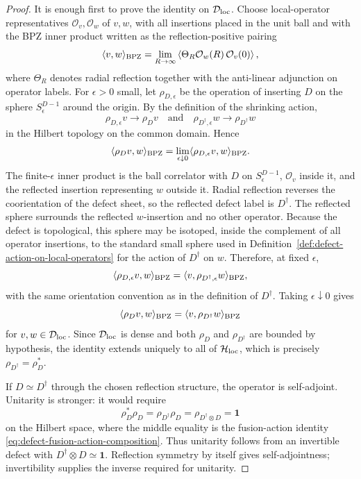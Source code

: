 \begin{proof}
It is enough first to prove the identity on
\(\mathcal D_{\rm loc}\).  Choose local-operator representatives
\(\mathcal O_v,\mathcal O_w\) of \(v,w\), with all insertions placed in the
unit ball and with the BPZ inner product written as the reflection-positive
pairing
\[
  \langle v,w\rangle_{\rm BPZ}
  =
  \lim_{R\to\infty}
  \left\langle
    \Theta_R\mathcal O_w(R)\,\mathcal O_v(0)
  \right\rangle ,
\]
where \(\Theta_R\) denotes radial reflection together with the anti-linear
adjunction on operator labels.  For \(\epsilon>0\) small, let
\(\rho_{D,\epsilon}\) be the operation of inserting \(D\) on the sphere
\(S_\epsilon^{D-1}\) around the origin.  By the definition of the shrinking
action,
\[
  \rho_{D,\epsilon}v\longrightarrow \rho_D v
  \quad\text{and}\quad
  \rho_{D^\dagger,\epsilon}w\longrightarrow \rho_{D^\dagger}w
\]
in the Hilbert topology on the common domain.  Hence
\[
  \langle \rho_Dv,w\rangle_{\rm BPZ}
  =
  \lim_{\epsilon\downarrow0}
  \langle \rho_{D,\epsilon}v,w\rangle_{\rm BPZ}.
\]
The finite-\(\epsilon\) inner product is the ball correlator with \(D\) on
\(S_\epsilon^{D-1}\), \(\mathcal O_v\) inside it, and the reflected insertion
representing \(w\) outside it.  Radial reflection reverses the coorientation
of the defect sheet, so the reflected defect label is \(D^\dagger\).  The
reflected sphere surrounds the reflected \(w\)-insertion and no other
operator.  Because the defect is topological, this sphere may be isotoped,
inside the complement of all operator insertions, to the standard small sphere
used in Definition~\ref{def:defect-action-on-local-operators} for the action
of \(D^\dagger\) on \(w\).  Therefore, at fixed \(\epsilon\),
\[
  \langle \rho_{D,\epsilon}v,w\rangle_{\rm BPZ}
  =
  \langle v,\rho_{D^\dagger,\epsilon}w\rangle_{\rm BPZ},
\]
with the same orientation convention as in the definition of \(D^\dagger\).
Taking \(\epsilon\downarrow0\) gives
\[
  \langle \rho_Dv,w\rangle_{\rm BPZ}
  =
  \langle v,\rho_{D^\dagger}w\rangle_{\rm BPZ}
\]
for \(v,w\in\mathcal D_{\rm loc}\).  Since
\(\mathcal D_{\rm loc}\) is dense and both \(\rho_D\) and
\(\rho_{D^\dagger}\) are bounded by hypothesis, the identity extends
uniquely to all of \(\mathcal H_{\rm loc}\), which is precisely
\(\rho_{D^\dagger}=\rho_D^*\).

If \(D\simeq D^\dagger\) through the chosen reflection structure, the
operator is self-adjoint.  Unitarity is stronger: it would require
\[
  \rho_D^*\rho_D
  =
  \rho_{D^\dagger}\rho_D
  =
  \rho_{D^\dagger\otimes D}
  =
  \mathbf 1
\]
on the Hilbert space, where the middle equality is the fusion-action
identity \eqref{eq:defect-fusion-action-composition}.  Thus unitarity follows
from an invertible defect with \(D^\dagger\otimes D\simeq\mathbf 1\).
Reflection symmetry by itself gives self-adjointness; invertibility supplies
the inverse required for unitarity.
\end{proof}

